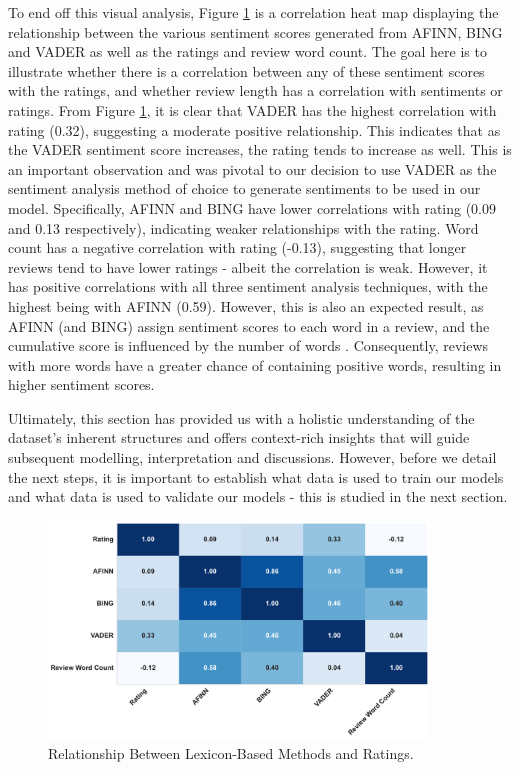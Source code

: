 To end off this visual analysis, Figure \ref{fig:correlation heat map sentiments} is a correlation heat map displaying the relationship between the various sentiment scores generated from AFINN, BING and VADER as well as the ratings and review word count. The goal here is to illustrate  whether there is a correlation between any of these sentiment scores with the ratings, and whether review length has a correlation with sentiments or ratings. From Figure \ref{fig:correlation heat map sentiments}, it is clear that VADER has the highest correlation with rating (0.32), suggesting a moderate positive relationship. This indicates that as the VADER sentiment score increases, the rating tends to increase as well. This is an important observation and was pivotal to our decision to use VADER as the sentiment analysis method of choice to generate sentiments to be used in our model. Specifically, AFINN and BING have lower correlations with rating (0.09 and 0.13 respectively), indicating weaker relationships with the rating.  Word count has a negative correlation with rating (-0.13), suggesting that longer reviews tend to have lower ratings - albeit the correlation is  weak. However, it has positive correlations with all three sentiment analysis techniques, with the highest being with AFINN (0.59). However, this is also an expected result, as AFINN (and BING) assign sentiment scores to each word in a review, and the cumulative score is influenced by the number of words \cite{haque2018sentiment}. Consequently, reviews with more words have a greater chance of containing positive words, resulting in higher sentiment scores. 

Ultimately, this section has provided us with a holistic understanding of the dataset's inherent structures and offers context-rich insights that will guide subsequent modelling, interpretation and discussions. However, before we detail the next steps, it is important to establish what data is used to train our models and what data is used to validate our models - this is studied in the next section. 

\begin{figure}[h]
  \centering
  \includegraphics[width=0.9\textwidth]{Figures/correlation_between_ratings_sentiment_scores_review_length.pdf} %
  \caption{Relationship Between Lexicon-Based Methods and Ratings.}
  \label{fig:correlation heat map sentiments}
\end{figure}


